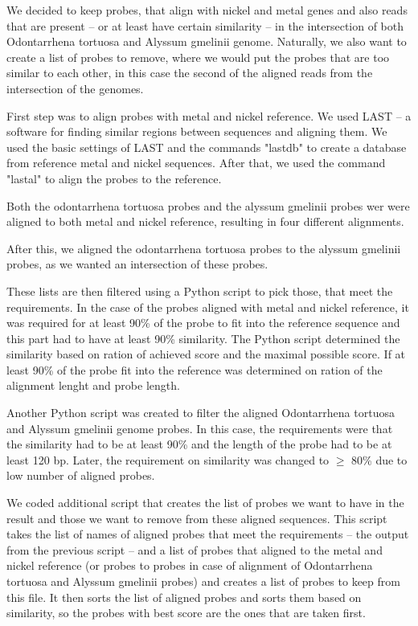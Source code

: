 We decided to keep probes, that align with nickel and metal genes and also reads that are present -- or at least have certain similarity -- in the intersection of both 
Odontarrhena tortuosa and Alyssum gmelinii genome. Naturally, we also want to create a list of probes to remove, where we would put the probes that are too similar to each other, in this 
case the second of the aligned reads from the intersection of the genomes. 

First step was to align probes with metal and nickel reference. We used LAST -- a software for finding similar regions between sequences and aligning them. \cite{last} 
We used the basic settings of LAST and the commands "lastdb" to create a database from reference metal and nickel sequences. After that, we used the command "lastal" to 
align the probes to the reference. 

Both the odontarrhena tortuosa probes and the alyssum gmelinii probes wer were aligned to both metal and nickel reference, resulting in four different alignments. 

After this, we aligned the odontarrhena tortuosa probes to the alyssum gmelinii probes, as we wanted an intersection of these probes. 

These lists are then filtered using a Python script to pick those, that meet the requirements. 
In the case of the probes aligned with metal and nickel reference, it was required for at least 90\% of the probe to fit into the reference sequence and this part had to have at least 90\% similarity. 
The Python script determined the similarity based on ration of achieved score and the maximal possible score. If at least 90\% of the probe fit into the reference was determined on ration of the alignment lenght 
and probe length. 

Another Python script was created to filter the aligned Odontarrhena tortuosa and Alyssum gmelinii genome probes. In this case, the requirements were that the similarity had to be at least 90\% and the length of the probe had to be at least 120 bp. Later, the requirement on similarity was changed to $\geq$ 80\% due to low number of aligned probes. 

We coded additional script that creates the list of probes we want to have in the result and those we want to remove from these aligned sequences. 
This script takes the list of names of aligned probes that meet the requirements -- the output from the previous script -- and a list of probes that aligned to the metal and nickel reference (or probes to probes in case of alignment of Odontarrhena tortuosa and Alyssum gmelinii probes) and creates a list of probes to keep from this file. It then sorts the list of aligned probes and sorts them based on similarity, so the 
probes with best score are the ones that are taken first. 


